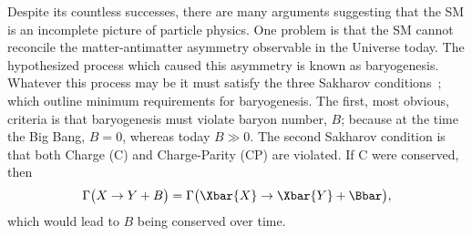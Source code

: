 Despite its countless successes,
there are many arguments suggesting that the SM is an incomplete
picture of particle physics.
One problem is that the SM cannot reconcile the matter-antimatter asymmetry observable in the
Universe today.
The hypothesized process which caused this asymmetry is known as baryogenesis.
Whatever this process may be it must satisfy the three Sakharov
conditions~\cite{1991SvPhU..34..392S}; which outline minimum requirements for baryogenesis.
The first, most obvious, criteria is that baryogenesis must violate baryon number, $B$; because at
the time the Big Bang, $B=0$, whereas today $B\gg0$.
The second Sakharov condition is that both Charge (C) and Charge-Parity (CP) are violated.
If C were conserved, then
\begin{equation}
  \Gamma\big(X\to Y+B\big)=\Gamma\big(\Xbar{X} \to \Xbar{Y}+\Bbar\big),
\end{equation}
which would lead to $B$ being conserved over time.
